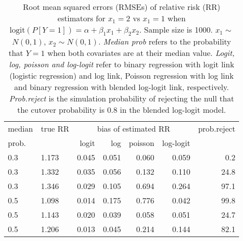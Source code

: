 \documentclass[12pt,a4paper]{article}
\begin{document}
\begin{table}[H] 
\small\sf\centering 
\caption{Root mean squared errors (RMSEs) of relative risk (RR) estimators for $x_1=2$ vs $x_1=1$ when $\mbox{logit}(P[Y=1])=\alpha+\beta_1 x_1 + \beta_2 x_2$. Sample size is 1000. $x_1 \sim $$N(0,1)$, $x_2 \sim N(0,1)$. {\it Median prob} refers to the probability that $Y=1$ when both covariates are at their median value. {\it Logit, log, poisson and log-logit} refer to binary regression with logit link (logistic regression) and log link, Poisson regression with log link and binary regression with blended log-logit link, respectively. {\it Prob.reject} is the simulation probability of rejecting the null that the cutover probability is $0.8$ in the blended log-logit model.} 
\begin{tabular}{llrrrrr} 
\toprule 
median & true RR & \multicolumn{4}{c}{bias of estimated RR} & prob.reject \\ 
prob. & & logit & log & poisson & log-logit  & \\ \midrule 
0.3 & 1.173 & 0.045 & 0.051 & 0.060 & 0.059 &  0.2 \\  
0.3 & 1.332 & 0.035 & 0.056 & 0.132 & 0.110 & 24.8 \\  
0.3 & 1.346 & 0.029 & 0.105 & 0.694 & 0.264 & 97.1 \\  
0.5 & 1.098 & 0.014 & 0.175 & 0.776 & 0.042 & 99.8 \\  
0.5 & 1.143 & 0.020 & 0.039 & 0.058 & 0.051 & 24.7 \\  
0.5 & 1.206 & 0.013 & 0.045 & 0.214 & 0.144 & 82.1 \\  
\bottomrule 
\end{tabular} 
\end{table} 
\end{document}
